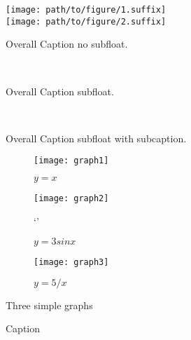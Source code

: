 \begin{figure}[ht]
    \center
    \texttt{[image: path/to/figure/1.suffix]}\\
    \texttt{[image: path/to/figure/2.suffix]}
    \caption{Overall Caption no subfloat.}
\label{fig:no_subfloat}
\end{figure}

\begin{figure}[ht]
    \center
    \\
    \caption{Overall Caption subfloat.}
\label{fig:subfloat}
\end{figure}

\begin{figure}[ht]
    \center
    \\
    \caption{Overall Caption subfloat with subcaption.}
\label{fig:subfloat_subcaption}
\end{figure}

\begin{figure}
    \centering
    \begin{subfigure}[b]{0.3\textwidth}
        \centering
        \texttt{[image: graph1]}
        \caption{$y=x$}
        \label{fig:y equals x}
    \end{subfigure}
    \hfill
    \begin{subfigure}[b]{0.3\textwidth}
        \centering
        \texttt{[image: graph2]}
        \caption{$y=3sinx$}`'
        \label{fig:three sin x}
    \end{subfigure}
    \hfill
    \begin{subfigure}[b]{0.3\textwidth}
        \centering
        \texttt{[image: graph3]}
        \caption{$y=5/x$}
        \label{fig:five over x}
    \end{subfigure}
       \caption{Three simple graphs}
       \label{fig:three graphs}
\end{figure}


\begin{figure}
    \centering
    \hfill
    \hfill
    \hfill
    \caption{Caption}
\end{figure}
